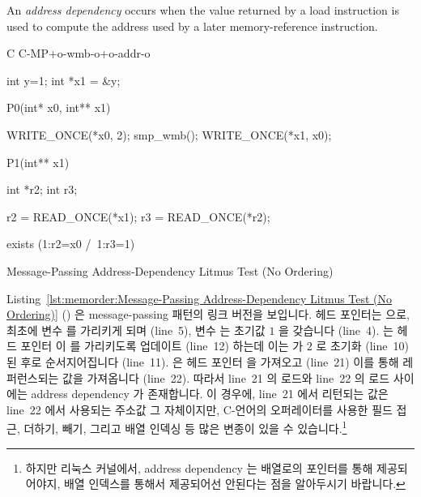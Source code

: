 An \emph{address dependency} occurs when the value returned by a load
instruction is used to compute the address used by a later memory-reference
instruction.
\fi

\begin{listing}[tbp]
{ \scriptsize
\begin{verbbox}[\LstLineNo]
C C-MP+o-wmb-o+o-addr-o

{
int y=1;
int *x1 = &y;
}

P0(int* x0, int** x1) {

  WRITE_ONCE(*x0, 2);
  smp_wmb();
  WRITE_ONCE(*x1, x0);

}

P1(int** x1) {

  int *r2;
  int r3;

  r2 = READ_ONCE(*x1);
  r3 = READ_ONCE(*r2);

}

exists (1:r2=x0 /\ 1:r3=1)
\end{verbbox}
}
\centering
\theverbbox
\caption{Message-Passing Address-Dependency Litmus Test (No Ordering)}
\label{lst:memorder:Message-Passing Address-Dependency Litmus Test (No Ordering)}
\end{listing}

Listing~\ref{lst:memorder:Message-Passing Address-Dependency Litmus Test (No Ordering)}
()
은 message-passing 패턴의 링크 버전을 보입니다.
헤드 포인터는  으로, 최초에  변수  를 가리키게 되며
(line~5), 변수  는 초기값 $1$ 을 갖습니다 (line~4).
 는 헤드 포인터  이  를 가리키도록 업데이트 (line~12)
하는데 이는  가 $2$ 로 초기화 (line~10) 된 후로 순서지어집니다
(line~11).
 은 헤드 포인터  을 가져오고 (line~21) 이를 통해 레퍼런스되는
값을 가져옵니다 (line~22).
따라서 line~21 의 로드와 line~22 의 로드 사이에는 address dependency 가
존재합니다.
이 경우에, line~21 에서 리턴되는 값은 line~22 에서 사용되는 주소값 그
자체이지만, C-언어의 \co{->} 오퍼레이터를 사용한 필드 접근, 더하기, 빼기,
그리고 배열 인덱싱 등 많은 변종이 있을 수 있습니다.\footnote{
	하지만 리눅스 커널에서, address dependency 는 배열로의 포인터를 통해
	제공되어야지, 배열 인덱스를 통해서 제공되어선 안된다는 점을 알아두시기
	바랍니다.}
\iffalse

